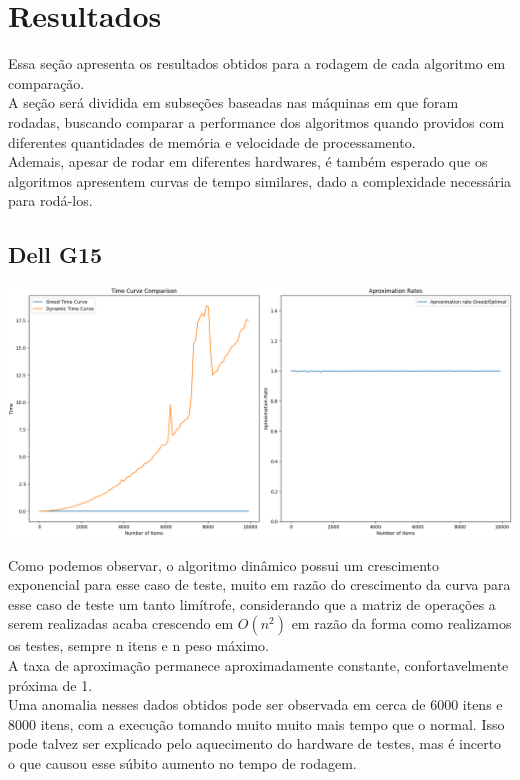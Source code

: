 \documentclass{article}
\begin{document}
\section{Resultados} %
    Essa seção apresenta os resultados obtidos para a rodagem de cada algoritmo em comparação.\\
    A seção será dividida em subseções baseadas nas máquinas em que foram rodadas, buscando comparar
    a performance dos algoritmos quando providos com diferentes quantidades de memória e velocidade de processamento.\\
    Ademais, apesar de rodar em diferentes hardwares, é também esperado que os algoritmos apresentem curvas de tempo similares, dado a complexidade necessária para rodá-los.

    \subsection{Dell G15}
        \includegraphics[scale = .3]{images/Figure_1.png}\label{Dell g15 execution}

        Como podemos observar, o algoritmo dinâmico possui um crescimento exponencial para esse caso de teste, muito em razão do crescimento da curva para esse caso de teste um tanto limítrofe, considerando que a matriz de operações a serem realizadas acaba crescendo em $O(n^2)$ em razão da forma como realizamos os testes, sempre n itens e n peso máximo.\\
        A taxa de aproximação permanece aproximadamente constante, confortavelmente próxima de 1.\\
        Uma anomalia nesses dados obtidos pode ser observada em cerca de 6000 itens e 8000 itens, com a execução tomando muito muito mais tempo que o normal. Isso pode talvez ser explicado pelo aquecimento do hardware de testes, mas é incerto o que causou esse súbito aumento no tempo de rodagem. \\
        
\end{document}

